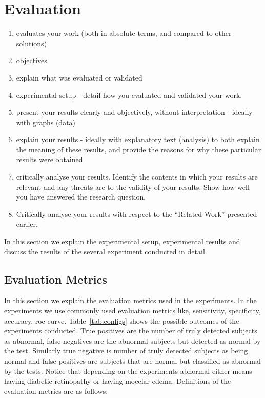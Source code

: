 \chapter{Evaluation}

\begin{enumerate}
    \item evaluates your work (both in absolute terms, and compared to other solutions)
    \item objectives
    \item explain what was evaluated or validated
    \item experimental setup - detail how you evaluated and validated your work.
    \item present your results clearly and objectively, without interpretation - ideally with graphs (data)
    \item explain your results - ideally with explanatory text (analysis) to both explain the meaning of these results, and provide the reasons for why these particular results were obtained
    \item critically analyse your results. Identify the contents in which your results are relevant and any threats are to the validity of your results. Show how well you have answered the research question.
    \item Critically analyse your results with respect to the ``Related Work'' presented earlier.
\end{enumerate}

In this section we explain the experimental setup, experimental results and discuss the results of the several experiment conducted in detail. 

\section{Evaluation Metrics}
In this section we explain the evaluation metrics used in the experiments. In the experiments we use commonly used evaluation metrics like, sensitivity, specificity, accuracy, roc curve. Table~\ref{tab:configs} shows the possible outcomes of the experiments conducted. True positives are the number of truly detected subjects as abnormal, false negatives are the abnormal subjects but detected as normal by the test. Similarly true negative is number of truly detected subjects as being normal and false positives are subjects that are normal but classified as abnormal by the tests. Notice that depending on the experiments abnormal either means having diabetic retinopathy or having mocelar edema. Definitions of the evaluation metrics are as follows: 

